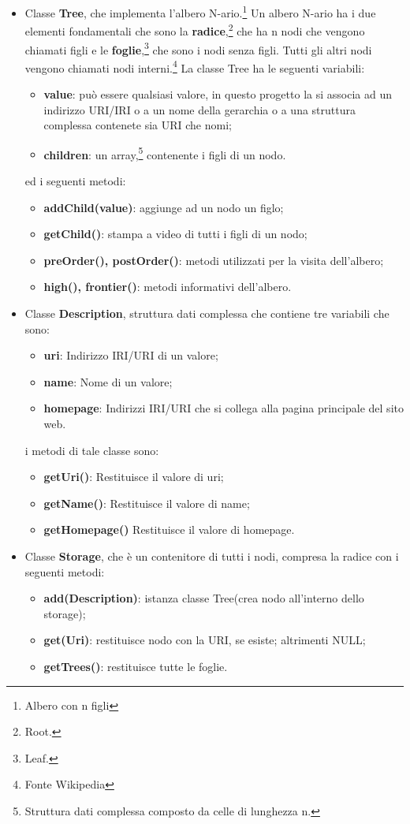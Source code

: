 \documentclass[a4paper,11pt]{article}
\begin{document}
\begin{itemize}
	\item Classe \textbf{Tree}, che implementa l'albero N-ario.\footnote{Albero con n figli} Un albero N-ario ha i due elementi fondamentali che sono la \textbf{radice},\footnote{Root.} che ha n nodi che vengono chiamati figli e le \textbf{foglie},\footnote{Leaf.} che sono i nodi senza figli. Tutti gli altri nodi vengono chiamati nodi interni.\footnote{Fonte Wikipedia}
La classe Tree	ha le seguenti variabili:
\begin{itemize}
	\item \textbf{value}: può essere qualsiasi valore, in questo progetto la si associa ad un indirizzo URI/IRI o a un nome della gerarchia o a una struttura complessa contenete sia URI che nomi;
	\item \textbf{children}: un array,\footnote{Struttura dati complessa composto da celle di lunghezza n.} contenente i figli di un nodo.
\end{itemize}
ed i seguenti metodi:
\begin{itemize}
	\item \textbf{addChild(value)}: aggiunge ad un nodo un figlo;
	\item \textbf{getChild()}: stampa a video di tutti i figli di un nodo;
	\item \textbf{preOrder(), postOrder()}: metodi utilizzati per la visita dell'albero;
	\item \textbf{high(), frontier()}: metodi informativi dell'albero.
\end{itemize}			
	\item Classe \textbf{Description}, struttura dati complessa che contiene tre variabili che sono:
\begin{itemize}
	\item \textbf{uri}: Indirizzo IRI/URI di un valore;
	\item \textbf{name}: Nome di un valore;
	\item \textbf{homepage}: Indirizzi IRI/URI che si collega alla pagina principale del sito web.
\end{itemize}	
i metodi di tale classe sono:
\begin{itemize}
	\item \textbf{getUri()}: Restituisce il valore di uri;
	\item \textbf{getName()}: Restituisce il valore di name;
	\item \textbf{getHomepage()} Restituisce il valore di homepage.
\end{itemize} \newpage
\item Classe \textbf{Storage}, che è un contenitore di tutti i nodi, compresa la radice con i seguenti metodi:
\begin{itemize}
	\item \textbf{add(Description)}: istanza classe Tree(crea nodo all'interno dello storage);
	\item \textbf{get(Uri)}: restituisce nodo con la URI, se esiste; altrimenti NULL;
	\item \textbf{getTrees()}: restituisce tutte le foglie.
\end{itemize}
\end{itemize}	
\end{document}
